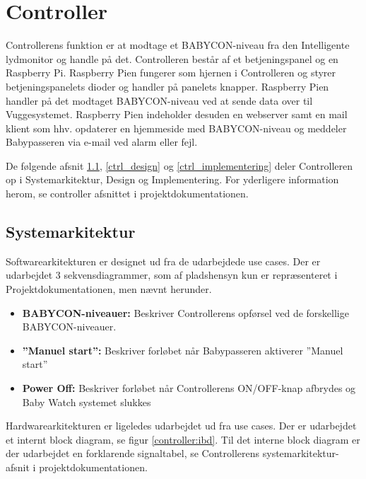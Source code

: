 \chapter{Controller}

Controllerens funktion er at modtage et BABYCON-niveau fra den Intelligente lydmonitor og handle på det. Controlleren består af et betjeningspanel og en Raspberry Pi. Raspberry Pien fungerer som hjernen i Controlleren og styrer betjeningspanelets dioder og handler på panelets knapper. Raspberry Pien handler på det modtaget BABYCON-niveau ved at sende data over \iic til Vuggesystemet. Raspberry Pien indeholder desuden en webserver samt en mail klient som hhv. opdaterer en hjemmeside med BABYCON-niveau og meddeler Babypasseren via e-mail ved alarm eller fejl.

De følgende afsnit \ref{ctrl_sysark}, \ref{ctrl_design} og \ref{ctrl_implementering} deler Controlleren op i Systemarkitektur, Design og Implementering. For yderligere information herom, se controller afsnittet i projektdokumentationen.

\section{Systemarkitektur}
\label{ctrl_sysark}

Softwarearkitekturen er designet ud fra de udarbejdede use cases. Der er udarbejdet 3 sekvensdiagrammer, som af pladshensyn kun er repræsenteret i Projektdokumentationen, men nævnt herunder. 

\begin{itemize}
\item \textbf{BABYCON-niveauer:} Beskriver Controllerens opførsel ved de forskellige BABYCON-niveauer.
\item \textbf{''Manuel start'':} Beskriver forløbet når Babypasseren aktiverer ''Manuel start''
\item \textbf{Power Off:} Beskriver forløbet når Controllerens ON/OFF-knap afbrydes og Baby Watch systemet slukkes 
\end{itemize}

Hardwarearkitekturen er ligeledes udarbejdet ud fra use cases. Der er udarbejdet et internt block diagram, se figur \ref{controller:ibd}. Til det interne block diagram er der udarbejdet en forklarende signaltabel, se Controllerens systemarkitektur-afsnit i projektdokumentationen.



